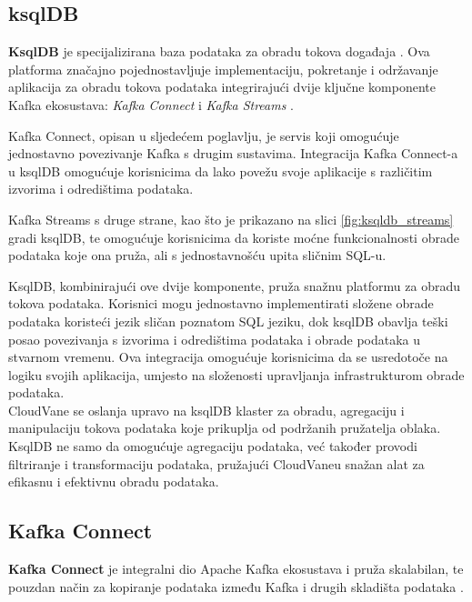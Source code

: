 \documentclass[times, utf8, diplomski]{fer}
\begin{document}
\subsection{ksqlDB}
\label{sec:ksql}

\textbf{KsqlDB} je specijalizirana baza podataka za obradu tokova događaja . Ova platforma značajno pojednostavljuje implementaciju, pokretanje i održavanje aplikacija za obradu tokova podataka integrirajući dvije ključne komponente Kafka ekosustava: \emph{Kafka Connect} i \emph{Kafka Streams} \citep{seymour_mastering_2021}.

Kafka Connect, opisan u sljedećem poglavlju, je servis koji omogućuje jednostavno povezivanje Kafka s drugim sustavima. Integracija Kafka Connect-a u ksqlDB omogućuje korisnicima da lako povežu svoje aplikacije s različitim izvorima i odredištima podataka.

Kafka Streams s druge strane, kao što je prikazano na slici \ref{fig:ksqldb_streams} gradi ksqlDB, te omogućuje korisnicima da koriste moćne funkcionalnosti obrade podataka koje ona pruža, ali s jednostavnošću upita sličnim SQL-u.

KsqlDB, kombinirajući ove dvije komponente, pruža snažnu platformu za obradu tokova podataka. Korisnici mogu jednostavno implementirati složene obrade podataka koristeći jezik sličan poznatom SQL jeziku, dok ksqlDB obavlja teški posao povezivanja s izvorima i odredištima podataka i obrade podataka u stvarnom vremenu. Ova integracija omogućuje korisnicima da se usredotoče na logiku svojih aplikacija, umjesto na složenosti upravljanja infrastrukturom obrade podataka. \\

CloudVane se oslanja upravo na ksqlDB klaster za obradu, agregaciju i manipulaciju tokova podataka koje prikuplja od podržanih pružatelja oblaka. KsqlDB ne samo da omogućuje agregaciju podataka, već također provodi filtriranje i transformaciju podataka, pružajući CloudVaneu snažan alat za efikasnu i efektivnu obradu podataka.


\subsection{Kafka Connect}
\label{sec:connect}

\textbf{Kafka Connect} je integralni dio Apache Kafka ekosustava i pruža skalabilan, te pouzdan način za kopiranje podataka između Kafka i drugih skladišta podataka \citep{shapira_kafka_2021}.
\end{document}
